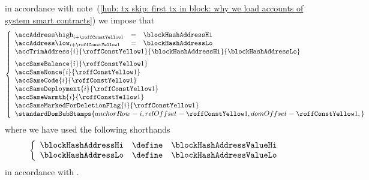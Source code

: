 \item[\underline{\underline{Loading the \inst{BLOCKHASH} system smart contract:}}] 
	in accordance with
	note~(\ref{hub: tx skip: first tx in block: why we load accounts of system smart contracts})
	we impose that
	\[
		\left\{ \begin{array}{lclr}
			\accAddress  \high _{i + \roffTxSkipSysiBlockHashSystemContractAccount} & = & \blockHashAddressHi \\
			\accAddress  \low  _{i + \roffTxSkipSysiBlockHashSystemContractAccount} & = & \blockHashAddressLo \\
			\multicolumn{4}{l}{
				\accTrimAddress
				{i}{\roffTxSkipSysiBlockHashSystemContractAccount}
				{\blockHashAddressHi}
				{\blockHashAddressLo}} \vspace{2mm} \\
			\multicolumn{3}{l}{\accSameBalance                       {i}{\roffTxSkipSysiBlockHashSystemContractAccount}} \\
			\multicolumn{3}{l}{\accSameNonce                         {i}{\roffTxSkipSysiBlockHashSystemContractAccount}} \\
			\multicolumn{3}{l}{\accSameCode                          {i}{\roffTxSkipSysiBlockHashSystemContractAccount}} \\
			\multicolumn{3}{l}{\accSameDeployment                    {i}{\roffTxSkipSysiBlockHashSystemContractAccount}} \\
			\multicolumn{3}{l}{\accSameWarmth                        {i}{\roffTxSkipSysiBlockHashSystemContractAccount}} \\
			\multicolumn{3}{l}{\accSameMarkedForDeletionFlag         {i}{\roffTxSkipSysiBlockHashSystemContractAccount}} \\
			\multicolumn{3}{l}{
				\standardDomSubStamps {
					anchorRow = i                                             ,
					relOffset = \roffTxSkipSysiBlockHashSystemContractAccount ,
					domOffset = \roffTxSkipSysiBlockHashSystemContractAccount ,
				}
			} \\
		\end{array} \right.
	\]
	where we have used the following shorthands
	\[
		\left\{ \begin{array}{lcl}
			\blockHashAddressHi & \define & \blockHashAddressValueHi \\
			\blockHashAddressLo & \define & \blockHashAddressValueLo \\
		\end{array} \right.
	\]
	in accordance with \cite{EIP-4788}.
